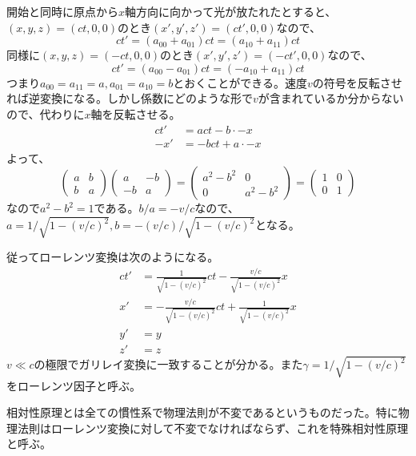     開始と同時に原点から$x$軸方向に向かって光が放たれたとすると、$(x, y, z) = (ct, 0, 0)$のとき$(x', y', z') = (ct', 0, 0)$なので、
        \[ct' = (a_{00} + a_{01})ct = (a_{10} + a_{11})ct\]
    同様に$(x, y, z) = (-ct, 0, 0)$のとき$(x', y', z') = (-ct', 0, 0)$なので、
        \[ct' = (a_{00} - a_{01})ct = (-a_{10} + a_{11})ct\]
    つまり$a_{00} = a_{11} = a, a_{01} = a_{10} = b$とおくことができる。速度$v$の符号を反転させれば逆変換になる。しかし係数にどのような形で$v$が含まれているか分からないので、代わりに$x$軸を反転させる。
    \begin{align*}
        ct' &= act - b \cdot -x\\
        -x' &= -bct + a \cdot -x
    \end{align*}
    よって、
    \[
        \begin{pmatrix}
            a & b\\
            b & a
        \end{pmatrix}
        \begin{pmatrix}
            a & -b\\
            -b & a
        \end{pmatrix}
        =
        \begin{pmatrix}
            a^2 - b^2 & 0\\
            0 & a^2 - b^2
        \end{pmatrix}
        =
        \begin{pmatrix}
            1 & 0\\
            0 & 1
        \end{pmatrix}
    \]
    なので$a^2 - b^2 = 1$である。$b / a = -v / c$なので、$a = 1 / \sqrt{1-(v/c)^2}, b = -(v / c) / \sqrt{1-(v/c)^2}$となる。

    従ってローレンツ変換は次のようになる。
    \begin{align*}
        ct' &= \frac{1}{\sqrt{1 - (v / c)^2}}ct - \frac{v / c}{\sqrt{1 - (v / c)^2}}x\\
        x'  &= -\frac{v / c}{\sqrt{1 - (v / c)^2}}ct + \frac{1}{\sqrt{1 - (v / c)^2}}x\\
        y'  &= y\\
        z'  &= z
    \end{align*}
    $v \ll c$の極限でガリレイ変換に一致することが分かる。また$\gamma = 1 / \sqrt{1 - (v / c)^2}$をローレンツ因子と呼ぶ。

    相対性原理とは全ての慣性系で物理法則が不変であるというものだった。特に物理法則はローレンツ変換に対して不変でなければならず、これを特殊相対性原理と呼ぶ。

